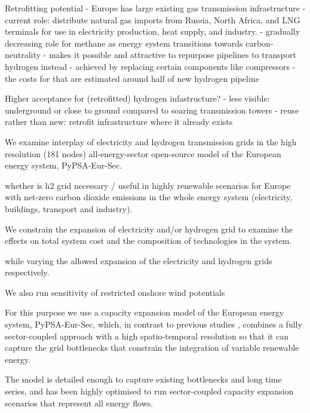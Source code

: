Retrofitting potential
- Europe has large existing gas transmission infrastructure
- current role: distribute natural gas imports from Russia, North Africa, and LNG terminals for use in electricity production, heat supply, and industry.
- gradually decreasing role for methane as energy system transitions towards carbon-neutrality
- makes it possible and attractive to repurpose pipelines to transport hydrogen instead
- achieved by replacing certain components like compressors
- the costs for that are estimated around half of new hydrogen pipeline

Higher acceptance for (retrofitted) hydrogen infastructure?
- less visible: underground or close to ground compared to soaring transmission towers
- reuse rather than new: retrofit infrastructure where it already exists


We examine interplay of electricity and hydrogen transmission grids in the high
resolution (181 nodes) all-energy-sector open-source model of the European
energy system, PyPSA-Eur-Sec.

whether is h2 grid necessary / useful in highly
renewable scenarios for Europe with net-zero carbon dioxide emissions
in the whole energy system (electricity, buildings, transport and
industry).

We constrain the expansion of electricity and/or hydrogen grid to examine the
effects on total system cost and the composition of technologies in the system.

while
varying the allowed expansion of the electricity and hydrogen grids
respectively.

We also run sensitivity of restricted onshore wind potentials


For this purpose we use a capacity expansion model of the European energy
system, PyPSA-Eur-Sec, which, in contrast to previous studies
\cite{henningComprehensiveModel2014,mathiesenSmartEnergy2015,IEESWV,connollySmartEnergy2016,lofflerDesigningModel2017,blancoPotentialHydrogen2018,brownSynergiesSector2018,in-depth_2018,victoria2020},
combines a fully sector-coupled approach with a high spatio-temporal resolution
so that it can capture the grid bottlenecks that constrain the integration of
variable renewable energy.

The model is detailed enough to capture existing
bottlenecks and long time series, and has been highly optimised to run
sector-coupled capacity expansion scenarios that represent all energy flows.


